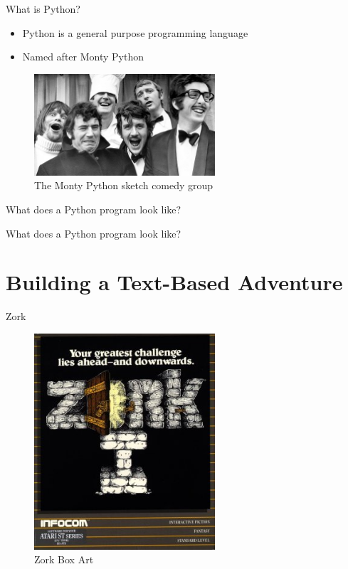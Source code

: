 \documentclass[10pt]{beamer}
\begin{document}
\begin{frame}{What is Python?}
	\begin{itemize}
		\item Python is a general purpose programming language
		\item Named after Monty Python
	\end{itemize}

 	\begin{figure}[c]
 		\includegraphics[width=0.6\textwidth]{images/montypython}
 		\\
		The Monty Python sketch comedy group\cite{WikiMontyPython}
 	\end{figure}

\end{frame}

\begin{frame}[fragile]{What does a Python program look like?}
	
\end{frame}

\begin{frame}[fragile]{What does a Python program look like?}
	
\end{frame}

\section{Building a Text-Based Adventure}

\begin{frame}{Zork}
	\begin{figure}[c]
		\includegraphics[width=0.6\textwidth]{./images/Zork_I_box_art.jpg}
		\\
		Zork Box Art\cite{WikiZork}
	\end{figure}
\end{frame}
\end{document}
